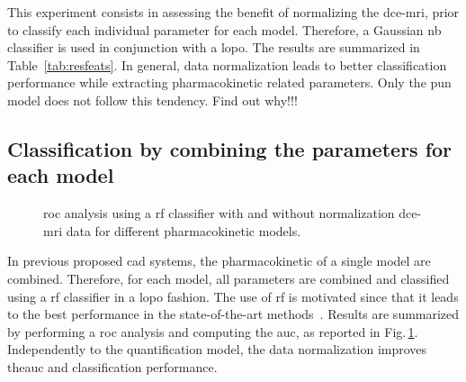This experiment consists in assessing the benefit of normalizing the \ac{dce}-\ac{mri}, prior to classify each individual parameter for each model.
Therefore, a Gaussian \ac{nb} classifier is used in conjunction with a \ac{lopo}.
The results are summarized in Table~\ref{tab:resfeats}.
In general, data normalization leads to better classification performance while extracting pharmacokinetic related parameters.
Only the \ac{pun} model does not follow this tendency.
{\color{red} Find out why!!!}

\subsection{Classification by combining the parameters for each model}

\begin{figure}
  \centering
  \hspace*{\fill}
   \hfill
  \hspace*{\fill}
  \caption{\acs*{roc} analysis using a \acs*{rf} classifier with and without normalization \ac{dce}-\ac{mri} data for different pharmacokinetic models.}
  \label{fig:normpharmarf}
\end{figure}

In previous proposed \ac{cad} systems, the pharmacokinetic of a single model are combined.
Therefore, for each model, all parameters are combined and classified using a \ac{rf} classifier in a \ac{lopo} fashion.
The use of \ac{rf} is motivated since that it leads to the best performance in the state-of-the-art methods~\citep{litjens2014computer}.
Results are summarized by performing a \ac{roc} analysis and computing the \ac{auc}, as reported in Fig.\,\ref{fig:normpharmarf}.
Independently to the quantification model, the data normalization improves the\ac{auc} and classification performance.

